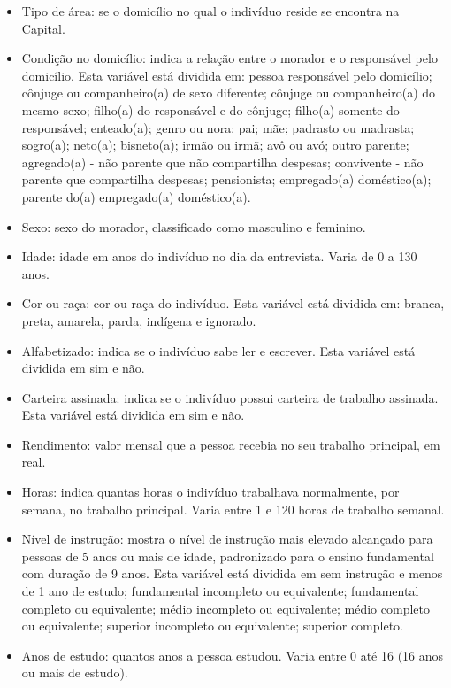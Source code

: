 \documentclass[12pt,a4paper,header]{abnt}
\begin{document}
\begin{itemize}
    \item[\textbf{•}]Tipo de área: se o domicílio no qual o indivíduo reside se encontra na Capital.
    \item[\textbf{•}]Condição no domicílio: indica a relação entre o morador e o responsável pelo domicílio. Esta variável está dividida em: pessoa responsável pelo domicílio; cônjuge ou companheiro(a) de sexo diferente; cônjuge ou companheiro(a) do mesmo sexo; filho(a) do responsável e do cônjuge; filho(a) somente do responsável; enteado(a); genro ou nora; pai; mãe; padrasto ou madrasta; sogro(a); neto(a); bisneto(a); irmão ou irmã; avô ou avó; outro parente; agregado(a) - não parente que não compartilha despesas; convivente - não parente que compartilha despesas; pensionista; empregado(a) doméstico(a); parente do(a) empregado(a) doméstico(a).
    \item[\textbf{•}]Sexo: sexo do morador, classificado como masculino e feminino.
    \item[\textbf{•}]Idade: idade em anos do indivíduo no dia da entrevista. Varia de 0 a 130 anos.
    \item[\textbf{•}]Cor ou raça: cor ou raça do indivíduo. Esta variável está dividida em: branca, preta, amarela, parda, indígena e ignorado.
    \item[\textbf{•}]Alfabetizado: indica se o indivíduo sabe ler e escrever. Esta variável está dividida em sim e não.
    \item[\textbf{•}]Carteira assinada: indica se o indivíduo possui carteira de trabalho assinada. Esta variável está dividida em sim e não.
    \item[\textbf{•}]Rendimento: valor mensal que a pessoa recebia no seu trabalho principal, em real.
    \item[\textbf{•}]Horas: indica quantas horas o indivíduo trabalhava normalmente, por semana, no trabalho principal. Varia entre 1 e 120 horas de trabalho semanal.
    \item[\textbf{•}]Nível de instrução: mostra o nível de instrução mais elevado alcançado para pessoas de 5 anos ou mais de idade, padronizado para o ensino fundamental com duração de 9 anos. Esta variável está dividida em sem instrução e menos de 1 ano de estudo; fundamental incompleto ou equivalente; fundamental completo ou equivalente; médio incompleto ou equivalente; médio completo ou equivalente; superior incompleto ou equivalente; superior completo.
    \item[\textbf{•}]Anos de estudo: quantos anos a pessoa estudou. Varia entre 0 até 16 (16 anos ou mais de estudo).

\end{itemize}
\end{document}
